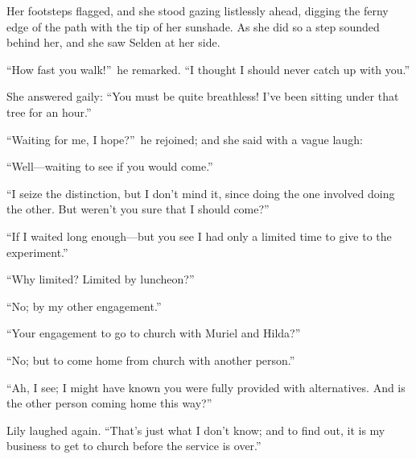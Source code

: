 \documentclass[12pt,a4paper]{book}
\begin{document}
Her footsteps flagged, and she stood gazing listlessly ahead,
digging the ferny edge of the path with the tip of her sunshade. 
As she did so a step sounded behind her, and she saw Selden at
her side.





``How fast you walk!''\ he remarked. ``I thought I should never catch
up with you.''





She answered gaily: ``You must be quite breathless! I've been
sitting under that tree for an hour.''





``Waiting for me, I hope?''\ he rejoined; and she said with a vague
laugh:\  



``Well---waiting to see if you would come.''





``I seize the distinction, but I don't mind it, since doing the
one involved doing the other. But weren't you sure that I should
come?''





``If I waited long enough---but you see I had only a limited time
to give to the experiment.''





``Why limited? Limited by luncheon?''





``No; by my other engagement.''





``Your engagement to go to church with Muriel and Hilda?''





``No; but to come home from church with another person.''





``Ah, I see; I might have known you were fully provided with
alternatives. And is the other person coming home this way?''





Lily laughed again. ``That's just what I don't know; and to find
out, it is my business to get to church before the service is
over.''
\end{document}
